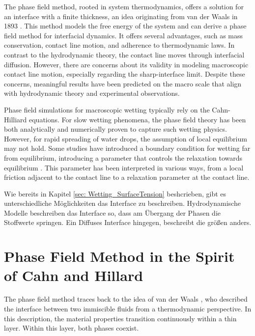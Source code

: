 The phase field method, rooted in system thermodynamics, offers a solution for an interface with a finite thickness, an idea originating from van der Waals in 1893 \cite{vanderwaals1979ThermodynamicTheoryCapillarity}. This method models the free energy of the system and can derive a phase field method for interfacial dynamics. It offers several advantages, such as mass conservation, contact line motion, and adherence to thermodynamic laws. In contrast to the hydrodynamic theory, the contact line moves through interfacial diffusion. However, there are concerns about its validity in modeling macroscopic contact line motion, especially regarding the sharp-interface limit. Despite these concerns, meaningful results have been predicted on the macro scale that align with hydrodynamic theory and experimental observations\cite{yue2010SharpinterfaceLimitCahn,yue2011CanDiffuseinterfaceModels,carlson2011DissipationRapidDynamic}.


Phase field simulations for macroscopic wetting typically rely on the Cahn-Hilliard equations. For slow wetting phenomena, the phase field theory has been both analytically \cite{jacqmin2000ContactlineDynamicsDiffuse} and numerically \cite{yue2011CanDiffuseinterfaceModels,yue2010SharpinterfaceLimitCahn} proven to capture such wetting physics. However, for rapid spreading of water drops, the assumption of local equilibrium may not hold. Some studies have introduced a boundary condition for wetting far from equilibrium, introducing a parameter that controls the relaxation towards equilibrium . This parameter has been interpreted in various ways, from a local friction adjacent to the contact line to a relaxation parameter at the contact line\cite{yue2011WallEnergyRelaxation}\cite{carlsonCapillarityDynamicWetting2012}.



Wie bereits in Kapitel \ref{sec: Wetting_SurfaceTension} beshcrieben, gibt es unterschiedliche Möglichkeiten das Interface zu beschreiben. Hydrodynamische Modelle beschreiben das Interface so, dass am Übergang der Phasen die Stoffwerte springen. Ein Diffuses Interface hingegen, beschreibt die größen anders. 

\section{Phase Field Method in the Spirit of Cahn and Hillard}
The phase field method traces back to the idea of van der Waals \cite{vanderwaals1979ThermodynamicTheoryCapillarity}, who described the interface between two immiscible fluids from a thermodynamic perspective. In this description, the material properties transition continuously within a thin layer. Within this layer, both phases coexist.

